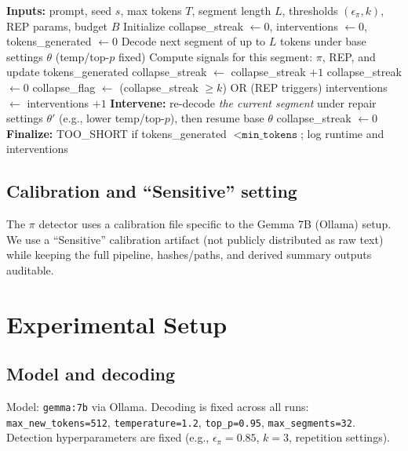 \documentclass{article}
\begin{document}
\begin{algorithm}[t]
\caption{Online monitoring and lightweight intervention (controlled mode)}
\label{alg:policy}
\begin{algorithmic}[1]
\STATE \textbf{Inputs:} prompt, seed $s$, max tokens $T$, segment length $L$, thresholds $(\epsilon_\pi, k)$, REP params, budget $B$
\STATE Initialize collapse\_streak $\leftarrow 0$, interventions $\leftarrow 0$, tokens\_generated $\leftarrow 0$
  \STATE Decode next segment of up to $L$ tokens under base settings $\theta$ (temp/top-$p$ fixed)
  \STATE Compute signals for this segment: $\pi$, REP, and update tokens\_generated
  \IF{$\pi > \epsilon_\pi$} \STATE collapse\_streak $\leftarrow$ collapse\_streak $+ 1$ \ELSE \STATE collapse\_streak $\leftarrow 0$ \ENDIF
  \STATE collapse\_flag $\leftarrow$ (collapse\_streak $\ge k$) OR (REP triggers)
     \STATE interventions $\leftarrow$ interventions $+ 1$
     \STATE \textbf{Intervene:} re-decode \emph{the current segment} under repair settings $\theta'$ (e.g., lower temp/top-$p$),
            then resume base $\theta$
     \STATE collapse\_streak $\leftarrow 0$
  \ENDIF
\ENDWHILE
\STATE \textbf{Finalize:} TOO\_SHORT if tokens\_generated $< \texttt{min\_tokens}$; log runtime and interventions
\end{algorithmic}
\end{algorithm}

\subsection{Calibration and ``Sensitive'' setting}
The $\pi$ detector uses a calibration file specific to the Gemma 7B (Ollama) setup.
We use a ``Sensitive'' calibration artifact (not publicly distributed as raw text) while keeping the full pipeline,
hashes/paths, and derived summary outputs auditable.

\section{Experimental Setup}
\subsection{Model and decoding}
Model: \texttt{gemma:7b} via Ollama.
Decoding is fixed across all runs: \texttt{max\_new\_tokens=512}, \texttt{temperature=1.2}, \texttt{top\_p=0.95}, \texttt{max\_segments=32}.
Detection hyperparameters are fixed (e.g., $\epsilon_\pi=0.85$, $k=3$, repetition settings).
\end{document}
